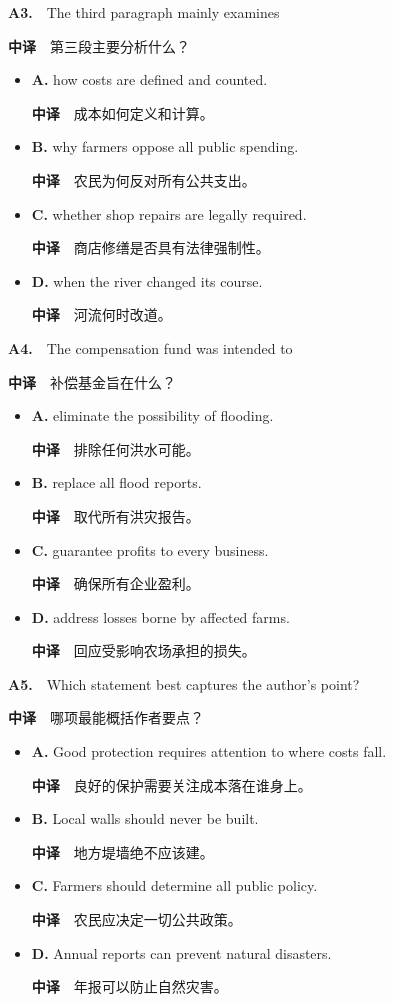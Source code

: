 \documentclass[
  11pt,
]{ctexart}
\begin{document}
\textbf{A3.}　The third paragraph mainly examines

\textbf{中译}　第三段主要分析什么？

\begin{itemize}
\item
  \textbf{A.} how costs are defined and counted.

  \textbf{中译}　成本如何定义和计算。
\item
  \textbf{B.} why farmers oppose all public spending.

  \textbf{中译}　农民为何反对所有公共支出。
\item
  \textbf{C.} whether shop repairs are legally required.

  \textbf{中译}　商店修缮是否具有法律强制性。
\item
  \textbf{D.} when the river changed its course.

  \textbf{中译}　河流何时改道。
\end{itemize}

\textbf{A4.}　The compensation fund was intended to

\textbf{中译}　补偿基金旨在什么？

\begin{itemize}
\item
  \textbf{A.} eliminate the possibility of flooding.

  \textbf{中译}　排除任何洪水可能。
\item
  \textbf{B.} replace all flood reports.

  \textbf{中译}　取代所有洪灾报告。
\item
  \textbf{C.} guarantee profits to every business.

  \textbf{中译}　确保所有企业盈利。
\item
  \textbf{D.} address losses borne by affected farms.

  \textbf{中译}　回应受影响农场承担的损失。
\end{itemize}

\textbf{A5.}　Which statement best captures the author's point?

\textbf{中译}　哪项最能概括作者要点？

\begin{itemize}
\item
  \textbf{A.} Good protection requires attention to where costs fall.

  \textbf{中译}　良好的保护需要关注成本落在谁身上。
\item
  \textbf{B.} Local walls should never be built.

  \textbf{中译}　地方堤墙绝不应该建。
\item
  \textbf{C.} Farmers should determine all public policy.

  \textbf{中译}　农民应决定一切公共政策。
\item
  \textbf{D.} Annual reports can prevent natural disasters.

  \textbf{中译}　年报可以防止自然灾害。
\end{itemize}
\end{document}
